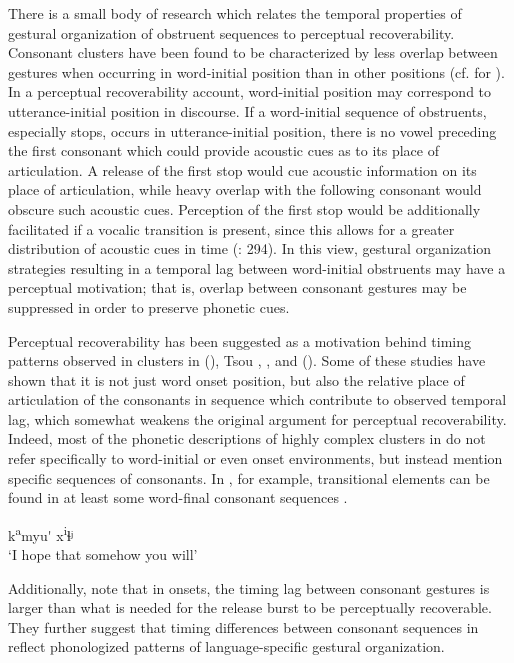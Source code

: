   There is a small body of research which relates the temporal properties of gestural organization of obstruent sequences to perceptual recoverability. Consonant clusters have been found to be characterized by less overlap between gestures when occurring in word-initial position than in other positions (cf. \citealt{Byrd1996a} for ). In a perceptual recoverability account, word-initial position may correspond to utterance-initial position in discourse. If a word-initial sequence of obstruents, especially stops, occurs in utterance-initial position, there is no vowel preceding the first consonant which could provide acoustic cues as to its place of articulation. A release of the first stop would cue acoustic information on its place of articulation, while heavy overlap with the following consonant would obscure such acoustic cues. Perception of the first stop would be additionally facilitated if a vocalic transition is present, since this allows for a greater distribution of acoustic cues in time (\citealt{RidouaneFougeron2011}: 294). In this view, gestural organization strategies resulting in a temporal lag between word-initial obstruents may have a perceptual motivation; that is, overlap between consonant gestures may be suppressed in order to preserve phonetic cues.

  Perceptual recoverability has been suggested as a motivation behind timing patterns observed in clusters in  (\citealt{SilvermanJun1994}), Tsou \citep{Wright1996},  \citep{ChitoranEtAl2002}, and  (\citealt{RidouaneFougeron2011}). Some of these studies have shown that it is not just word onset position, but also the relative place of articulation of the consonants in sequence which contribute to observed temporal lag, which somewhat weakens the original argument for perceptual recoverability. Indeed, most of the phonetic descriptions of highly complex clusters in  do not refer specifically to word-initial or even onset environments, but instead mention specific sequences of consonants. In , for example, transitional elements can be found in at least some word-final consonant sequences .

\ea\label{ex:8.9}

k\textsuperscript{a}myu\'{} x\textsuperscript{i}ɬʲ\\
\glt ‘I hope that somehow you will’
\citep[47]{Crawford1966}
\z

Additionally, \citet{ChitoranCohn2009} note that in  onsets, the timing lag between consonant gestures is larger than what is needed for the release burst to be perceptually recoverable. They further suggest that timing differences between consonant sequences in  reflect phonologized patterns of language-specific gestural organization.

